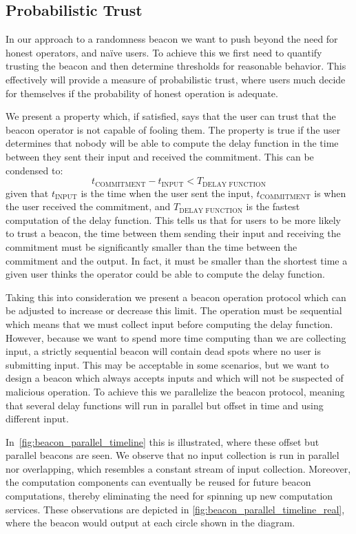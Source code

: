 \subsection{Probabilistic Trust}%
\label{sub:probabilistic_trust}
In our approach to a randomness beacon we want to push beyond the need for honest operators, and naïve users.
To achieve this we first need to quantify trusting the beacon and then determine thresholds for reasonable behavior.
This effectively will provide a measure of probabilistic trust, where users much decide for themselves if the probability of honest operation is adequate.

We present a property which, if satisfied, says that the user can trust that the beacon operator is not capable of fooling them.
The property is true if the user determines that nobody will be able to compute the delay function in the time between they sent their input and received the commitment.
This can be condensed to:
\begin{equation*}
    t_\text{COMMITMENT} - t_\text{INPUT} < T_\text{DELAY FUNCTION}
\end{equation*}
given that $t_\text{INPUT}$ is the time when the user sent the input, $t_\text{COMMITMENT}$ is when the user received the commitment, and $T_\text{DELAY FUNCTION}$ is the fastest computation of the delay function.
This tells us that for users to be more likely to trust a beacon, the time between them sending their input and receiving the commitment must be significantly smaller than the time between the commitment and the output.
In fact, it must be smaller than the shortest time a given user thinks the operator could be able to compute the delay function.

Taking this into consideration we present a beacon operation protocol which can be adjusted to increase or decrease this limit.
The operation must be sequential which means that we must collect input before computing the delay function.
However, because we want to spend more time computing than we are collecting input, a strictly sequential beacon will contain dead spots where no user is submitting input.
This may be acceptable in some scenarios, but we want to design a beacon which always accepts inputs and which will not be suspected of malicious operation.
To achieve this we parallelize the beacon protocol, meaning that several delay functions will run in parallel but offset in time and using different input.

In~\cref{fig:beacon_parallel_timeline} this is illustrated, where these offset but parallel beacons are seen.
We observe that no input collection is run in parallel nor overlapping, which resembles a constant stream of input collection.
Moreover, the computation components can eventually be reused for future beacon computations, thereby eliminating the need for spinning up new computation services.
These observations are depicted in \cref{fig:beacon_parallel_timeline_real}, where the beacon would output at each circle shown in the diagram.

